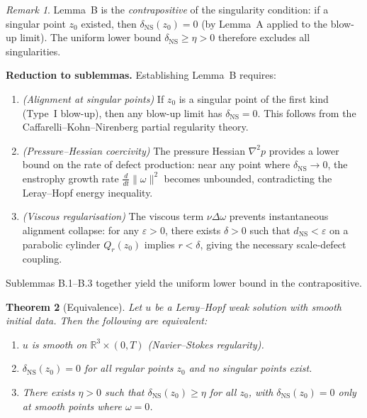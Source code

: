 \documentclass[11pt]{article}
\newtheorem{theorem}{Theorem}[section]
\theoremstyle{definition}
\theoremstyle{remark}
\newtheorem{remark}[theorem]{Remark}
\begin{document}
\begin{remark}
Lemma~B is the \emph{contrapositive} of the singularity condition: if a
singular point $z_0$ existed, then $\delta_{\mathrm{NS}}(z_0) = 0$ (by
Lemma~A applied to the blow-up limit).  The uniform lower bound
$\delta_{\mathrm{NS}} \geq \eta > 0$ therefore excludes all singularities.

\medskip
\noindent\textbf{Reduction to sublemmas.}  Establishing Lemma~B requires:
\begin{enumerate}
  \item[\textbf{B.1}] \emph{(Alignment at singular points)} If $z_0$ is a
    singular point of the first kind (Type~I blow-up), then any blow-up limit
    has $\delta_{\mathrm{NS}} = 0$.  This follows from the
    Caffarelli--Kohn--Nirenberg partial regularity theory.
  \item[\textbf{B.2}] \emph{(Pressure--Hessian coercivity)} The pressure
    Hessian $\nabla^2 p$ provides a lower bound on the rate of defect
    production: near any point where $\delta_{\mathrm{NS}} \to 0$, the
    enstrophy growth rate $\frac{d}{dt}\|\omega\|^2$ becomes unbounded,
    contradicting the Leray--Hopf energy inequality.
  \item[\textbf{B.3}] \emph{(Viscous regularisation)} The viscous term
    $\nu \Delta \omega$ prevents instantaneous alignment collapse: for any
    $\varepsilon > 0$, there exists $\delta > 0$ such that
    $d_{\mathrm{NS}} < \varepsilon$ on a parabolic cylinder $Q_r(z_0)$
    implies $r < \delta$, giving the necessary scale-defect coupling.
\end{enumerate}
Sublemmas B.1--B.3 together yield the uniform lower bound in the
contrapositive.
\end{remark}

\begin{theorem}[Equivalence]
\label{thm:ns-equiv}
Let $u$ be a Leray--Hopf weak solution with smooth initial data.  Then the
following are equivalent:
\begin{enumerate}
  \item[(i)] $u$ is smooth on $\mathbb{R}^3 \times (0,T)$ (Navier--Stokes regularity).
  \item[(ii)] $\delta_{\mathrm{NS}}(z_0) = 0$ for all regular points $z_0$
    and no singular points exist.
  \item[(iii)] There exists $\eta > 0$ such that
    $\delta_{\mathrm{NS}}(z_0) \geq \eta$ for all $z_0$, with
    $\delta_{\mathrm{NS}}(z_0) = 0$ only at smooth points where $\omega = 0$.
\end{enumerate}
\end{theorem}
\end{document}

